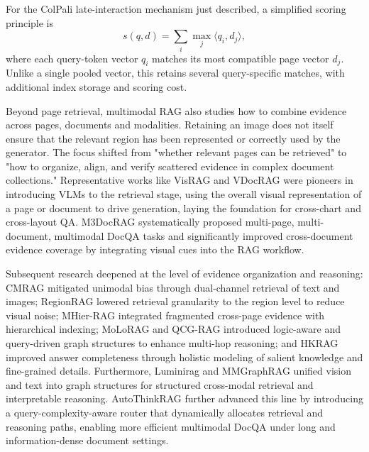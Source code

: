 For the ColPali late-interaction mechanism just described, a simplified scoring principle is
\[
s(q,d)=\sum_i \max_j \langle q_i,d_j\rangle,
\]
where each query-token vector $q_i$ matches its most compatible page vector $d_j$. Unlike a single pooled vector, this retains several query-specific matches, with additional index storage and scoring cost.

Beyond page retrieval, multimodal RAG also studies how to combine evidence across pages, documents and modalities. Retaining an image does not itself ensure that the relevant region has been represented or correctly used by the generator. The focus shifted from "whether relevant pages can be retrieved" to "how to organize, align, and verify scattered evidence in complex document collections." Representative works like VisRAG \cite{yu2024visrag} and VDocRAG \cite{tanaka2025vdocrag} were pioneers in introducing VLMs to the retrieval stage, using the overall visual representation of a page or document to drive generation, laying the foundation for cross-chart and cross-layout QA. M3DocRAG \cite{cho2024m3docrag} systematically proposed multi-page, multi-document, multimodal DocQA tasks and significantly improved cross-document evidence coverage by integrating visual cues into the RAG workflow.

Subsequent research deepened at the level of evidence organization and reasoning: CMRAG \cite{chen2025cmrag} mitigated unimodal bias through dual-channel retrieval of text and images; RegionRAG \cite{li2025regionrag} lowered retrieval granularity to the region level to reduce visual noise; MHier-RAG \cite{gong2025mhier} integrated fragmented cross-page evidence with hierarchical indexing; MoLoRAG \cite{wu2025molorag} and QCG-RAG \cite{wu2025query} introduced logic-aware and query-driven graph structures to enhance multi-hop reasoning; and HKRAG \cite{tong2025hkrag} improved answer completeness through holistic modeling of salient knowledge and fine-grained details. Furthermore, Luminirag \cite{martis2024luminirag} and MMGraphRAG \cite{wan2025mmgraphrag} unified vision and text into graph structures for structured cross-modal retrieval and interpretable reasoning. AutoThinkRAG \cite{autothinkrag} further advanced this line by introducing a query-complexity-aware router that dynamically allocates retrieval and reasoning paths, enabling more efficient multimodal DocQA under long and information-dense document settings.

